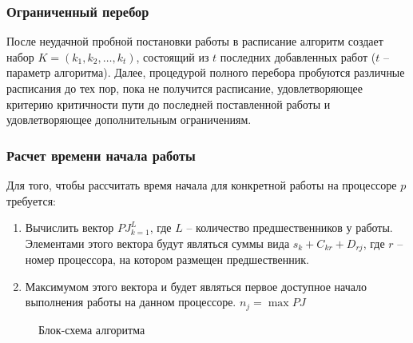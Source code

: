 \subsubsection*{Ограниченный перебор}
После неудачной пробной постановки работы в расписание алгоритм создает набор $K = \left( k_1, k_2, \dots, k_t \right)$, состоящий из $t$ последних добавленных работ ($t$ – параметр алгоритма). Далее, процедурой полного перебора пробуются различные расписания до тех пор, пока не получится расписание, удовлетворяющее критерию критичности пути до последней поставленной работы и удовлетворяющее дополнительным ограничениям.
\subsubsection*{Расчет времени начала работы}
Для того, чтобы рассчитать время начала  для конкретной работы на процессоре $p$ требуется:
\begin{enumerate}
    \item Вычислить вектор $PJ_{k=1}^L$, где $L$ – количество предшественников у работы. Элементами этого вектора будут являться суммы вида $s_k + C_{kr} + D_{rj}$, где $r$ – номер процессора, на котором размещен предшественник.
    \item Максимумом этого вектора и будет являться первое доступное начало выполнения работы на данном процессоре. $n_j=\max{PJ}$
\end{enumerate}

{\small
    \begin{figure}
        \label{fig:block-scheme}
        \caption{Блок-схема алгоритма}
    \end{figure}
}